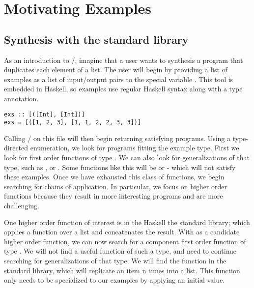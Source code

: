 \section{Motivating Examples} 
\label{examples}

\subsection{Synthesis with the standard library}

As an introduction to \ourTool/, imagine that a user wants to synthesis a  program that duplicates each element of a list. 
The user will begin by providing a list of examples as a list of input/output pairs to the special variable .
This tool is embedded in Haskell, so examples use regular Haskell syntax along with a type annotation.

\begin{lstlisting}
exs :: [([Int], [Int])]
exs = [([1, 2, 3], [1, 1, 2, 2, 3, 3])]
\end{lstlisting}

Calling \ourTool/ on this file will then begin returning satisfying programs.
Using a type-directed enumeration, we look for programs fitting the example type.
First we look for first order functions of type \codeinline{[Int]->[Int]}.
We can also look for generalizations of that type, such as \codeinline{[a]->[a]}, or .
Some functions like this will be  or  - which will not satisfy these examples.
Once we have exhausted this class of functions, we begin searching for chains of application.
In particular, we focus on higher order functions because they result in more interesting programs and are more challenging.

One higher order function of interest is in the Haskell the standard library;  which applies a function over a list and concatenates the result.
With  as a candidate higher order function, we can now search for a component first order function of type .
We will not find a useful function of such a type, and need to continue searching for generalizations of that type.
We will find the function  in the standard library, which will replicate an item n times into a list.
This function only needs to be specialized to our examples by applying an initial value.

